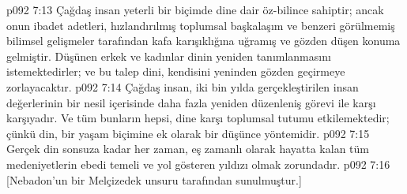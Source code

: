\vs p092 7:13 Çağdaş insan yeterli bir biçimde dine dair öz\hyp{}bilince sahiptir; ancak onun ibadet adetleri, hızlandırılmış toplumsal başkalaşım ve benzeri görülmemiş bilimsel gelişmeler tarafından kafa karışıklığına uğramış ve gözden düşen konuma gelmiştir. Düşünen erkek ve kadınlar dinin yeniden tanımlanmasını istemektedirler; ve bu talep dini, kendisini yeninden gözden geçirmeye zorlayacaktır.
\vs p092 7:14 Çağdaş insan, iki bin yılda gerçekleştirilen insan değerlerinin bir nesil içerisinde daha fazla yeniden düzenleniş görevi ile karşı karşıyadır. Ve tüm bunların hepsi, dine karşı toplumsal tutumu etkilemektedir; çünkü din, bir yaşam biçimine ek olarak bir düşünce yöntemidir.
\vs p092 7:15 Gerçek din sonsuza kadar her zaman, eş zamanlı olarak hayatta kalan tüm medeniyetlerin ebedi temeli ve yol gösteren yıldızı olmak zorundadır.
\vs p092 7:16 [Nebadon’un bir Melçizedek unsuru tarafından sunulmuştur.]
